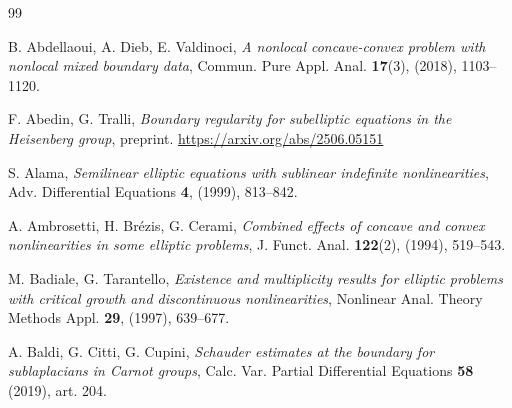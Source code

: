 \documentclass[11pt]{amsart}
\numberwithin{equation}{section} %
\theoremstyle{definition}
\begin{document}
\begin{thebibliography}{99}
	
	
	B. Abdellaoui, A. Dieb, E. Valdinoci,
	{\em A nonlocal concave-convex problem with nonlocal mixed boundary data},
	Commun. Pure Appl. Anal. {\bf 17}(3), (2018), 1103--1120.
	
	F. Abedin, G. Tralli,
	{\em Boundary regularity for subelliptic equations in the Heisenberg group},
	preprint. \url{https://arxiv.org/abs/2506.05151}
	
	
	S. Alama,
	{\em Semilinear elliptic equations with sublinear indefinite nonlinearities},
	Adv. Differential Equations {\bf 4}, (1999), 813--842.
	
%	
   A. Ambrosetti, H. Br\'{e}zis, G. Cerami, 
   {\em Combined effects of concave and convex nonlinearities in some elliptic problems},
   J. Funct. Anal. {\bf 122}(2), (1994), 519--543.


	
	
	
	
	M. Badiale, G. Tarantello, 
	{\em Existence and multiplicity results for elliptic problems with critical growth and discontinuous nonlinearities}, 
	Nonlinear Anal. Theory Methods Appl. {\bf 29}, (1997), 639--677. 
	
	A. Baldi, G. Citti, G. Cupini, 
	{\em Schauder estimates at the boundary for sublaplacians in Carnot groups}, 
	Calc. Var. Partial Differential Equations {\bf 58} (2019), art. 204.
	

\end{thebibliography}
\end{document}

